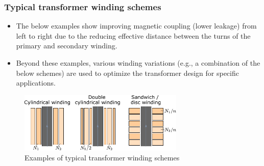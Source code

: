 \begin{frame}
	\frametitle{Typical transformer winding schemes}
	\begin{itemize}
		\item The below examples show improving magnetic coupling (lower leakage) from left to right due to the reducing effective distance between the turns of the primary and secondary winding.
		\item<2-> Beyond these examples, various winding variations (e.g., a combination of the below schemes) are used to optimize the transformer design for specific applications. 
	\end{itemize}
	\vspace{0.5em}
	\begin{figure}
		\includegraphics[width=0.7\textwidth]{fig/lec04/Transformer_winding_types.pdf}
		\caption{Examples of typical transformer winding schemes}
		\label{fig:Transformer_winding_types}
	\end{figure}
\end{frame}


